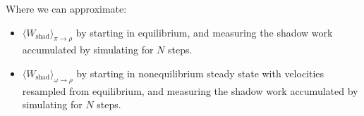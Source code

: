 \documentclass[11pt]{article}
\begin{document}
Where we can approximate:
\begin{itemize}
\item $\langle W_\text{shad} \rangle_{\pi \to \rho}$ by starting in equilibrium, and measuring the shadow work accumulated by simulating for $N$ steps.
\item $\langle W_\text{shad} \rangle_{\omega \to \rho}$ by starting in nonequilibrium steady state with velocities resampled from equilibrium, and measuring the shadow work accumulated by simulating for $N$ steps.
\end{itemize}
\end{document}
